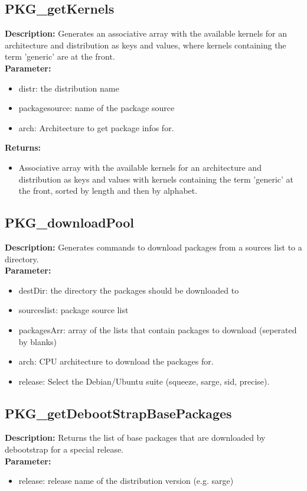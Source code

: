 \subsection{PKG\_getKernels}
\textbf{Description:} Generates an associative array with the available kernels for an architecture and distribution as keys and values, where kernels containing the term 'generic' are at the front.\\
\textbf{Parameter:}
\begin{itemize}
\item distr: the distribution name
\item packagesource: name of the package source
\item arch: Architecture to get package infos for.
\end{itemize}
\textbf{Returns:}
\begin{itemize}
\item Associative array with the available kernels for an architecture and distribution as keys and values with kernels containing the term 'generic' at the front, sorted by length and then by alphabet.
\end{itemize}

\subsection{PKG\_downloadPool}
\textbf{Description:} Generates commands to download packages from a sources list to a directory.\\
\textbf{Parameter:}
\begin{itemize}
\item destDir: the directory the packages should be downloaded to
\item sourceslist: package source list
\item packagesArr: array of the lists that contain packages to download (seperated by blanks)
\item arch: CPU architecture to download the packages for.
\item release: Select the Debian/Ubuntu suite (squeeze, sarge, sid, precise).
\end{itemize}

\subsection{PKG\_getDebootStrapBasePackages}
\textbf{Description:} Returns the list of base packages that are downloaded by debootstrap for a special release.\\
\textbf{Parameter:}
\begin{itemize}
\item release: release name of the distribution version (e.g. sarge)
\end{itemize}

